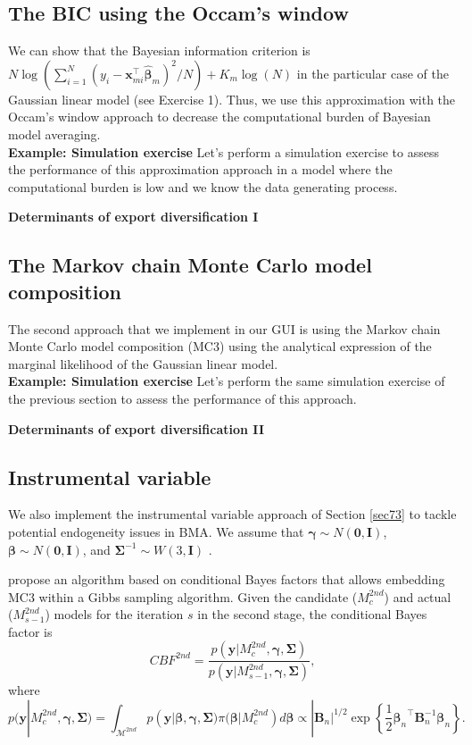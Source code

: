 \subsection{The BIC using the Occam's window}\label{sec10_21}

We can show that the Bayesian information criterion is $N\log(\sum_{i=1}^N(y_i-\bm{x}_{mi}^{\top}\hat{\bm{\beta}}_m)^2/N)+K_m\log(N)$ in the particular case of the Gaussian linear model (see Exercise 1). Thus, we use this approximation with the Occam's window approach to decrease the computational burden of Bayesian model averaging.\\

\textbf{Example: Simulation exercise}
Let's perform a simulation exercise to assess the performance of this approximation approach in a model where the computational burden is low and we know the data generating process.

\textbf{Determinants of export diversification I}


\subsection{The Markov chain Monte Carlo model composition}\label{sec10_22}
The second approach that we implement in our GUI is using the Markov chain Monte Carlo model composition (MC3) using the analytical expression of the marginal likelihood of the Gaussian linear model.\\

\textbf{Example: Simulation exercise}
Let's perform the same simulation exercise of the previous section to assess the performance of this approach. 

\textbf{Determinants of export diversification II}

\subsection{Instrumental variable }\label{sec10_23}

We also implement the instrumental variable approach of Section \ref{sec73} to tackle potential endogeneity issues in BMA. We assume that $\bm{\gamma}\sim {N}(\bm{0},\bm{I})$, $\bm{\beta}\sim {N}(\bm{0},\bm{I})$, and $\bm{\Sigma}^{-1} \sim {W}(3,\bm{I})$ \cite{Karl2012}.

\cite{Lenkoski2013} propose an algorithm based on conditional Bayes factors \cite{Dickey1978} that allows embedding MC3 within a Gibbs sampling algorithm. Given the candidate ($M_{c}^{2nd}$) and actual ($M_{s-1}^{2nd}$) models for the iteration $s$ in the second stage, the conditional Bayes factor is 
\begin{equation*}
	CBF^{2nd}=\frac{p(\bm{y}|M_{c}^{2nd},\bm{\gamma},\bm{\Sigma})}{p(\bm{y}|M_{s-1}^{2nd},\bm{\gamma},\bm{\Sigma})},
\end{equation*}
where 
\begin{equation*}
	p(\bm{y}|M_{c}^{2nd},\bm{\gamma},\bm{\Sigma})=\int_{\mathcal{M}^{2nd}}p(\bm{y}|\bm{\beta},\bm{\gamma},\bm{\Sigma})\pi(\bm{\beta}|M_{c}^{2nd})d\bm{\beta}\propto |\bm{B}_n|^{1/2} \exp\left\{\frac{1}{2}{\bm{\beta}_n}^{\top}\bm{B}_n^{-1}\bm{\beta}_n\right\}
	.
\end{equation*}


